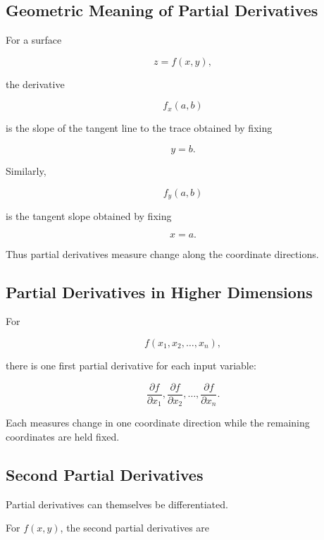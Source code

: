 \subsection{Geometric Meaning of Partial Derivatives}
\label{subsec:geometric-partials}

For a surface

\[ z=f(x,y), \]

the derivative

\[ f_x(a,b) \]

is the slope of the tangent line to the trace obtained by fixing

\[ y=b. \]

Similarly,

\[ f_y(a,b) \]

is the tangent slope obtained by fixing

\[ x=a. \]

Thus partial derivatives measure change along the coordinate directions.

\subsection{Partial Derivatives in Higher Dimensions}
\label{subsec:higher-dimensional-partials}

For

\[ f(x_1,x_2,\ldots,x_n), \]

there is one first partial derivative for each input variable:

\[ \frac{\partial f}{\partial x_1},
\frac{\partial f}{\partial x_2},
\ldots,
\frac{\partial f}{\partial x_n}. \]

Each measures change in one coordinate direction while the remaining
coordinates are held fixed.

\subsection{Second Partial Derivatives}
\label{subsec:second-partials}

Partial derivatives can themselves be differentiated.

For \(f(x,y)\), the second partial derivatives are

